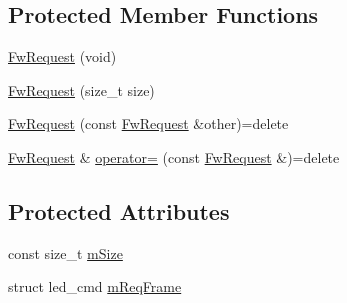 \subsection*{Protected Member Functions}
\begin{DoxyCompactItemize}
\item 
\hyperlink{class_wy_light_1_1_fw_request_af0e41b5308f4a6b4f1e45a70b23c9c57}{Fw\-Request} (void)
\item 
\hyperlink{class_wy_light_1_1_fw_request_aa9c0ee1fd5fa6e516ffd13294c28d0d8}{Fw\-Request} (size\-\_\-t size)
\item 
\hyperlink{class_wy_light_1_1_fw_request_a3a48b764c38378ca030968f5b89c3a52}{Fw\-Request} (const \hyperlink{class_wy_light_1_1_fw_request}{Fw\-Request} \&other)=delete
\item 
\hyperlink{class_wy_light_1_1_fw_request}{Fw\-Request} \& \hyperlink{class_wy_light_1_1_fw_request_aa32f77fa261a3156d4a6235376f9646d}{operator=} (const \hyperlink{class_wy_light_1_1_fw_request}{Fw\-Request} \&)=delete
\end{DoxyCompactItemize}
\subsection*{Protected Attributes}
\begin{DoxyCompactItemize}
\item 
const size\-\_\-t \hyperlink{class_wy_light_1_1_fw_request_af224c579af518569cc8a6d32f533a8fb}{m\-Size}
\item 
struct led\-\_\-cmd \hyperlink{class_wy_light_1_1_fw_request_a2c07f543884aab374e5de1c5c7e77b4e}{m\-Req\-Frame}
\end{DoxyCompactItemize}



